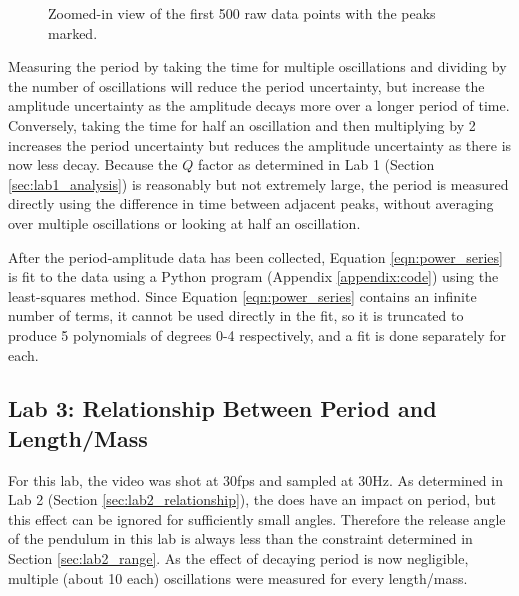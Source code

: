 \documentclass[aps,twocolumn,secnumarabic,nobalancelastpage,amsmath,amssymb,nofootinbib,floatfix,letterpaper]{revtex4}
\begin{document}
\begin{figure}[htb]
    \caption{Zoomed-in view of the first 500 raw data points with the peaks marked.}
    \label{fig:rawdata}
\end{figure}

Measuring the period by taking the time for multiple oscillations and dividing by the number of oscillations will reduce
the period uncertainty, but increase the amplitude uncertainty as the amplitude decays more over a longer period of
time. Conversely, taking the time for half an oscillation and then multiplying by 2 increases the period uncertainty but
reduces the amplitude uncertainty as there is now less decay. Because the \(Q\) factor as determined in Lab 1 (Section
\ref{sec:lab1_analysis}) is reasonably but not extremely large, the period is measured directly using the difference in
time between adjacent peaks, without averaging over multiple oscillations or looking at half an oscillation.

After the period-amplitude data has been collected, Equation \ref{eqn:power_series} is fit to the data using a Python
program (Appendix \ref{appendix:code}) using the least-squares method. Since Equation \ref{eqn:power_series} contains an
infinite number of terms, it cannot be used directly in the fit, so it is truncated to produce 5 polynomials of degrees
0-4 respectively, and a fit is done separately for each.

\subsection{Lab 3: Relationship Between Period and Length/Mass}
\label{sec:lab3_method}

For this lab, the video was shot at 30fps and sampled at 30Hz. As determined in Lab 2 (Section \ref{sec:lab2_relationship}),
the does have an impact on period, but this effect can be ignored for sufficiently small angles. Therefore the release
angle of the pendulum in this lab is always less than the constraint determined in Section \ref{sec:lab2_range}.
As the effect of decaying period is now negligible, multiple (about 10 each) oscillations were measured for every
length/mass.
\end{document}
